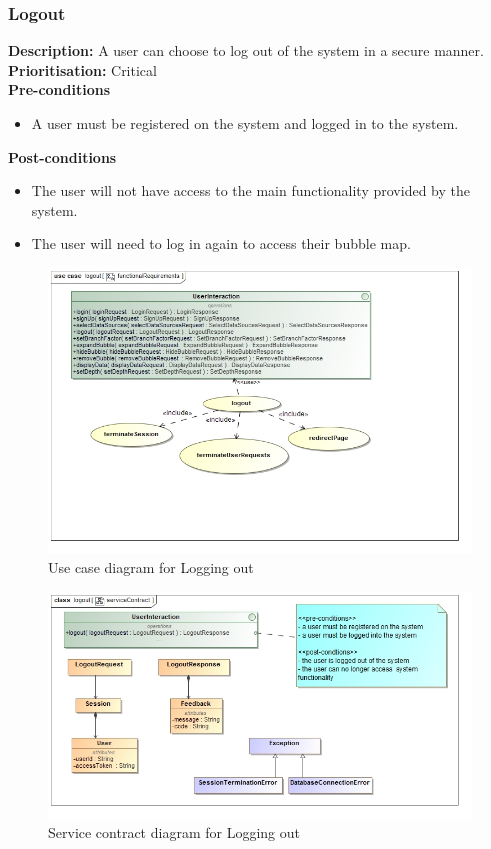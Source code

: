 \documentclass[hidelinks,english]{article}
\begin{document}
    		\subsubsection{Logout}
				\textbf{Description:}  A user can choose to log out of the system in a secure manner.\\
    			\textbf{Prioritisation:} Critical\\
      			\textbf{Pre-conditions}
    			\begin{itemize}
        			\item A user must be registered on the system and logged in to the system.
    			\end{itemize}
    			\textbf{Post-conditions}
     			\begin{itemize}
        			\item The user will not have access to the main functionality provided by the system.
        			\item The user will need to log in again to access their bubble map.
    			\end{itemize}

    		\begin{figure}[!h]
    			\includegraphics[width=\linewidth]{functionalRequirementsLogout.jpg}
    			\caption{Use case diagram for Logging out}
    			\label{UseCaseLogout}
    			\end{figure}
    			
    			\begin{figure}[!h]
    			\includegraphics[width=\linewidth]{serviceContractLogout.jpg}
    			\caption{Service contract diagram for Logging out}
    			\label{ServiceContractLogout}
    			\end{figure}
    			
\end{document}
